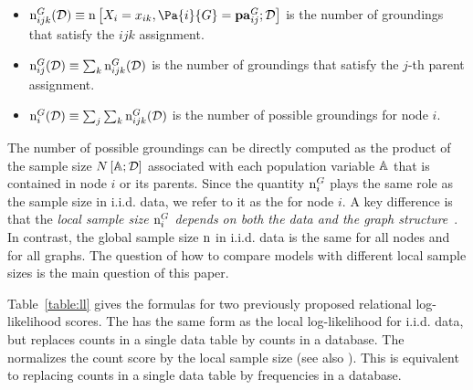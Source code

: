 \documentclass[letterpaper]{article}
\begin{document}
\begin{itemize}
\item $\Fcount{\graph}{ijk}{\dstructure} \equiv \Count{\node_{i} = \xvalue_{ik},\Pa{i}{\graph}=\pavalue{ij}{\graph}}{\dstructure}$ is the number of groundings that satisfy the $ijk$ assignment.
\item $\mathrm{n}^{G}_{ij}(\mathcal{D}) \equiv \sum_{k} \mathrm{n}^{G}_{ijk}(\mathcal{D})$ is the number of groundings that satisfy the $j$-th parent assignment.
\item $\mathrm{n}^{G}_{i}(\mathcal{D}) \equiv \sum_{j}\sum_{k} \mathrm{n}^{G}_{ijk}(\mathcal{D})$ is the number of possible groundings for node $i$.
\end{itemize}
The number of possible groundings can be directly computed as the product of the sample size $N\left[\mathbb{A};\mathcal{D}\right]$  associated with each population variable $\mathbb{A}$ that is contained in node $i$ or its parents. 
%
%
Since the quantity $\mathrm{n}_{i}^{G}$ plays the same role as the sample size in i.i.d. data, we refer to it as the  for node $i$. 
A key difference is that the {\em local sample size $\mathrm{n}_{i}^{G}$ depends on both the data and the graph structure}~\cite{Lowd2007}. In contrast, the global sample size $\mathrm{n}$ in i.i.d. data is the same for all nodes and for all graphs. 
The question of how to compare models with different local sample sizes is the main question of this paper.

Table~\ref{table:ll} gives the formulas for two previously proposed relational log-likelihood scores. The  has the same form as the local log-likelihood for i.i.d. data, but replaces counts in a single data table by counts in a database. The ~\cite{Schulte2011} normalizes the count score by the local sample size (see also \cite{Xiang2011}). This is equivalent to replacing counts in a single data table by frequencies in a database. 
\end{document}
